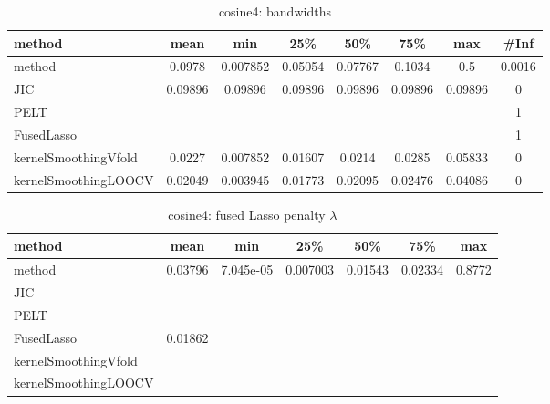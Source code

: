 \begin{table}[ht]
\centering
\begin{tabular}{l|c|ccccc|c}
  \hline
method & mean & min & 25\% & 50\% & 75\% & max & \#Inf \\ 
  \hline
method & 0.0978 & 0.007852 & 0.05054 & 0.07767 & 0.1034 &   0.5 & 0.0016 \\ 
  JIC & 0.09896 & 0.09896 & 0.09896 & 0.09896 & 0.09896 & 0.09896 &   0 \\ 
  PELT &  &  &  &  &  &  &   1 \\ 
  FusedLasso &  &  &  &  &  &  &   1 \\ 
  kernelSmoothingVfold & 0.0227 & 0.007852 & 0.01607 & 0.0214 & 0.0285 & 0.05833 &   0 \\ 
  kernelSmoothingLOOCV & 0.02049 & 0.003945 & 0.01773 & 0.02095 & 0.02476 & 0.04086 &   0 \\ 
   \hline
\end{tabular}
\caption{cosine4: bandwidths} 
\label{tab:cosine4Bandwidths}
\end{table}
\begin{table}[ht]
\centering
\begin{tabular}{l|c|ccccc}
  \hline
method & mean & min & 25\% & 50\% & 75\% & max \\ 
  \hline
method & 0.03796 & 7.045e-05 & 0.007003 & 0.01543 & 0.02334 & 0.8772 \\ 
  JIC &  &  &  &  &  &  \\ 
  PELT &  &  &  &  &  &  \\ 
  FusedLasso & 0.01862 &  &  &  &  &  \\ 
  kernelSmoothingVfold &  &  &  &  &  &  \\ 
  kernelSmoothingLOOCV &  &  &  &  &  &  \\ 
   \hline
\end{tabular}
\caption{cosine4: fused Lasso penalty $\lambda$} 
\label{tab:cosine4Lambdas}
\end{table}
